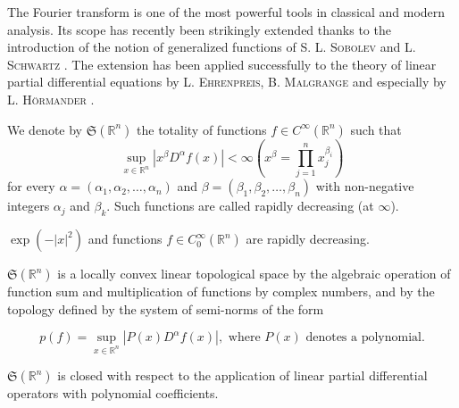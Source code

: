 \label{chap:VI}

The Fourier transform is one of the most powerful tools in classical and modern analysis. Its scope has recently been strikingly extended thanks to the introduction of the notion of generalized functions of S. L. \textsc{Sobolev} \cite{sobolev306} and L. \textsc{Schwartz} \cite{schwartz294}. The extension has been applied successfully to the theory of linear partial differential equations by L. \textsc{Ehrenpreis}, B. \textsc{Malgrange} and especially by L. \textsc{Hörmander} \cite{hormander118}. 


\label{sec:VI.1}

\begin{definition}\label{def:VI.1.Definition.1} We denote by $\mathfrak{S}(\mathbb{R}^{n})$ the totality of functions $f \in C^{\infty}(\mathbb{R}^{n})$ such that 
\begin{equation}\label{eq:VI.1.1}
\sup\limits _ {x \in \mathbb{R}^{n}} | x ^{\beta} D ^{\alpha} f (x) | < \infty \left(x ^{\beta} = \prod\limits_{j=1} ^{n} x _{j} ^ {\beta_{i}}\right)
\end{equation}
for every $\alpha = (\alpha_{1},\alpha_{2},\ldots ,\alpha_{n})$ and $\beta = (\beta_{1},\beta_{2},\dots ,\beta_{n})$ with non-negative integers $\alpha_{j}$ and $\beta_{k}$. Such functions are called rapidly decreasing (at $\infty$). 
\end{definition}

\begin{examplen} $\exp (-|x|^2)$ and functions $f\in C_0^\infty (\mathbb{R}^{n})$ are rapidly decreasing.

\end{examplen}
\begin{proposition}\label{prop:VI.1.Proposition.1} $\mathfrak{S}(\mathbb{R}^{n})$ is a locally convex linear topological space by the algebraic operation of function sum and multiplication of functions by complex numbers, and by the topology defined by the system of semi-norms of the form 

\begin{equation}\label{eq:VI.1.2}
p(f) = \sup\limits_{x\in \mathbb{R}^{n}}|P(x)D^\alpha f(x)|, \text{ where } P(x) \text{ denotes a polynomial}.
\end{equation}
\end{proposition}

\begin{proposition}\label{prop:VI.1.Proposition.2} $\mathfrak{S}(\mathbb{R}^{n})$ is closed with respect to the application of linear partial differential operators with polynomial coefficients. 
\end{proposition}

